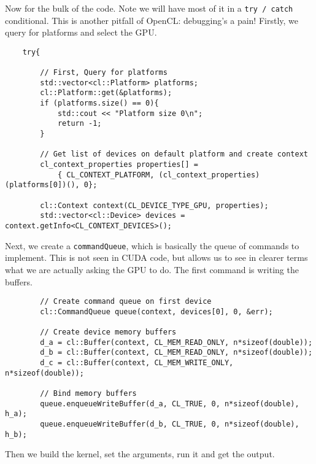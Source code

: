 \documentclass[11pt]{article}
\begin{document}
Now for the bulk of the code. Note we will have most of it in a \lstinline{try / catch} conditional. This is another pitfall of OpenCL: debugging's a pain! Firstly, we query for platforms and select the GPU.

\begin{lstlisting}
    try{

        // First, Query for platforms
        std::vector<cl::Platform> platforms;
        cl::Platform::get(&platforms);
        if (platforms.size() == 0){
            std::cout << "Platform size 0\n";
            return -1;
        }

        // Get list of devices on default platform and create context
        cl_context_properties properties[] =
            { CL_CONTEXT_PLATFORM, (cl_context_properties)(platforms[0])(), 0};

        cl::Context context(CL_DEVICE_TYPE_GPU, properties);
        std::vector<cl::Device> devices = context.getInfo<CL_CONTEXT_DEVICES>();

\end{lstlisting}

Next, we create a \lstinline{commandQueue}, which is basically the queue of commands to implement. This is not seen in CUDA code, but allows us to see in clearer terms what we are actually asking the GPU to do. The first command is writing the buffers.

\begin{lstlisting}
        // Create command queue on first device
        cl::CommandQueue queue(context, devices[0], 0, &err);

        // Create device memory buffers
        d_a = cl::Buffer(context, CL_MEM_READ_ONLY, n*sizeof(double));
        d_b = cl::Buffer(context, CL_MEM_READ_ONLY, n*sizeof(double));
        d_c = cl::Buffer(context, CL_MEM_WRITE_ONLY, n*sizeof(double));

        // Bind memory buffers
        queue.enqueueWriteBuffer(d_a, CL_TRUE, 0, n*sizeof(double), h_a);
        queue.enqueueWriteBuffer(d_b, CL_TRUE, 0, n*sizeof(double), h_b);

\end{lstlisting}

Then we build the kernel, set the arguments, run it and get the output.
\end{document}
